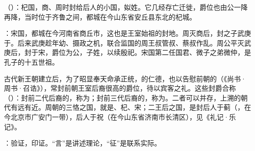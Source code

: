 {
\item {}（）：杞国，商、周时封给后人的小国，姒姓。它几经存亡迁徙，爵位也由公一降再降，当时位于齐鲁之间，都城在今山东省安丘县东北的杞城。

：宋国，都城在今河南省商丘市，这也是王室始祖的封地。周灭商后，封之子武庚于。后来武庚趁年幼、摄政之机，联合监国的周王叔管叔、蔡叔作乱。周公平灭武庚后，封于宋，爵位为公，子姓，以续殷祀。宋国第二任国君、微子之弟微仲，是孔子的十五世祖。

古代新王朝建立后，为了昭显奉天命承正统，的仁德，也以告慰前朝的（《尚书·周书·召诰》），常封前朝王室后裔很高的爵位，待以宾客之礼。这些封爵合称（）：封前二代后裔的，称为；封前三代后裔的，称为。二者可以并存，上溯的朝代有远有近。周朝的三恪之国，就是、杞、宋；二王后之国，是封后人于蓟（，在今北京市广安门一带），后人于祝（在今山东省济南市长清区），见《礼记·乐记》。

\item {}：验证，印证。“言”是讲述理论，“征”是联系实际。
}
{}  %


